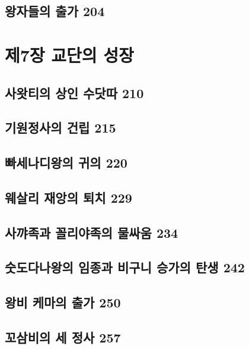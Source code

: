 \documentclass[12pt, a4paper, oneside]{book}
\let\stdsection\section
\renewcommand\section{\newpage\stdsection}
\begin{document}
	\section{왕자들의 출가 204}





	\chapter{제7장 교단의 성장}
	\noptcrule
	\parttoc				

	\section{사왓티의 상인 수닷따 210 }

	\section{기원정사의 건립 215 }

	\section{빠세나디왕의 귀의 220 }

	\section{웨살리 재앙의 퇴치 229 }

	\section{사꺄족과 꼴리야족의 물싸움 234 }

	\section{숫도다나왕의 임종과 비구니 승가의 탄생 242 }

	\section{왕비 케마의 출가 250 }

	\section{꼬삼비의 세 정사 257 }
\end{document}
